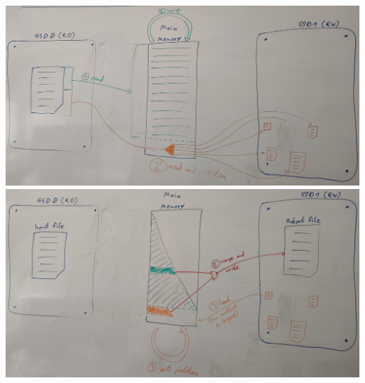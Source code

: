 \documentclass[a1paper,portrait,american,fontscale=.4]{baposter}
\begin{document}
\begin{poster}
{        \begin{center}
            \includegraphics[scale=.2]{fig/external_sort_1.jpg}
            \includegraphics[scale=.2]{fig/external_sort_2.jpg}
        \end{center}

}
\end{poster}
\end{document}
